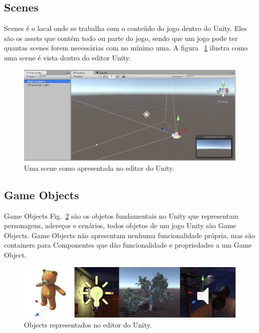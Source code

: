 \subsection{Scenes}

Scenes é o local onde se trabalha com o conteúdo do jogo dentro do Unity. Eles são os assets que contém todo ou parte do jogo, sendo que um jogo pode ter quantas scenes forem necessárias com no mínimo uma. A figura ~\ref{fig:scene1} ilustra como uma scene é vista dentro do editor Unity.

\begin{figure}[h!]
  \includegraphics[width=\linewidth]{scene.jpg}
  \caption{Uma scene como apresentada no editor do Unity.}
  \label{fig:scene1}
\end{figure}
\subsection{Game Objects}

Game Objects Fig.~\ref{fig:objects} são os objetos fundamentais no Unity que representam personagens, adereços e cenários, todos objetos de um jogo Unity são Game Objects. Game Objects não apresentam nenhuma funcionalidade própria, mas são containers para Componentes que dão funcionalidade e propriedades a um Game Object.

\begin{figure}[h!]
  \includegraphics[width=\linewidth]{object.jpg}
  \caption{Objects representados no editor do Unity.}
  \label{fig:objects}
\end{figure}

